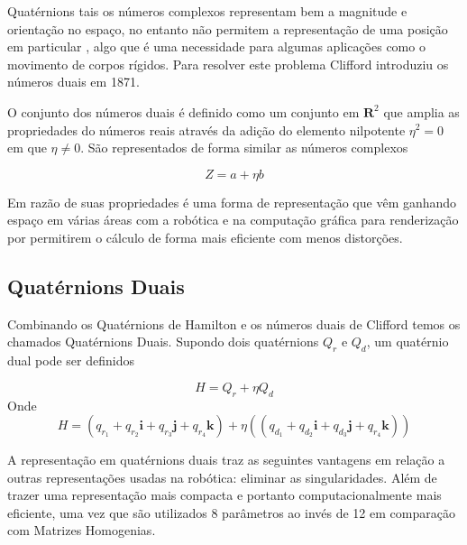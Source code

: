 Quatérnions tais os números complexos representam bem a magnitude e orientação no espaço, no entanto não permitem a representação de uma posição em particular \cite{Clifford1871DQ}, algo que é uma necessidade para algumas aplicações como o movimento de corpos rígidos. Para resolver este problema Clifford introduziu os números duais em 1871.

O conjunto dos números duais é definido como um conjunto em $\mathbf{R}^2$ que amplia as propriedades do números reais através da adição do elemento nilpotente $\eta^2 = 0$ em que $\eta \neq 0$. São representados de forma similar as números complexos

\begin{equation}
    Z = a + \eta b
\end{equation}


Em razão de suas propriedades é uma forma de representação que vêm ganhando espaço em várias áreas com a robótica \cite{Adorno2011} e na computação gráfica para renderização \cite{kavan2006dual} por permitirem o cálculo de forma mais eficiente com menos distorções.

\subsection{Quatérnions Duais}

Combinando os Quatérnions de Hamilton e os números duais de Clifford temos os chamados Quatérnions Duais. Supondo dois quatérnions $Q_r$ e $Q_d$, um quatérnio dual pode ser definidos

\begin{equation}
    H = Q_r + \eta Q_d
\end{equation}
Onde
\begin{equation}
    H = (q_{r_1} + q_{r_2}\mathbf{{i}} + q_{r_3}\mathbf{{j}} + q_{r_4}\mathbf{{k}}) + \eta ((q_{d_1} + q_{d_2}\mathbf{{i}} + q_{d_3}\mathbf{{j}} + q_{r_4}\mathbf{{k}}))
\end{equation}


A representação em quatérnions duais traz as seguintes vantagens em relação a outras representações usadas na robótica: eliminar as singularidades. Além de trazer uma representação mais compacta e portanto computacionalmente mais eficiente, uma vez que são utilizados 8 parâmetros ao invés de 12 em comparação com Matrizes Homogenias.\cite{Adorno2011} %

